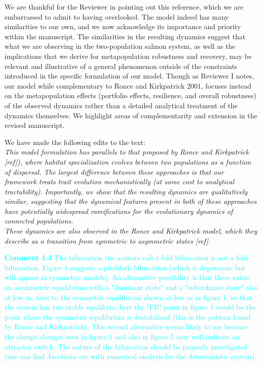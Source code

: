 \documentclass[ucm,12pt]{ucletter}
\begin{document}
\begin{letter}
 We are thankful for the Reviewer in pointing out this reference, which we are embarrassed to admit to having overlooked. The model indeed has many similarities to our own, and we now acknowledge its importance and priority within the manuscript. The similarities in the resulting dynamics suggest that what we are observing in the two-population salmon system, as well as the implications that we derive for metapopulation robustness and recovery, may be  relevant and illustrative of a general phenomenon outside of the constraints introduced in the specific formulation of our model. Though as Reviewer I notes, our model while complementary to Ronce and Kirkpatrick 2001, focuses instead on the metapopulation effects (portfolio effects, resilience, and overall robustness) of the observed dynamics rather than a detailed analytical treatment of the dynamics themselves. We highlight areas of complementarity and extension in the revised manuscript.

\noindent We have made the following edits to the text:\\
 \emph{This model formulation has parallels to that proposed by Ronce and Kirkpatrick [ref]), where habitat specialization evolves between two populations as a function of dispersal.
The largest difference between these approaches is that our framework treats trait evolution mechanistically (at some cost to analytical tractability).
Importantly, we show that the resulting dynamics are qualitatively similar, suggesting that the dynamical features present in both of these approaches have potentially widespread ramifications for the evolutionary dynamics of connected populations.}\\
 \emph{These dynamics are also observed in the Ronce and Kirkpatrick model, which they describe as a transition from symmetric to asymmetric states [ref].}


\noindent \textcolor{cyan}{
{\bf Comment 1.3} The bifurcation the authors call a fold bifurcation is not a fold bifurcation. Figure 1 suggests a pitchfork bifurcation (which is degenerate but will appear in symmetric models). An alternative possibility is that there exists an asymmetric equilibrium with a "dominant state" and a "subordinate state" also at low m, next to the symmetric equilibrium shown at low m in figure 1, so that the system has two stable equilibria; here the "FB" point in figure 1 would be the point where the symmetric equilibrium is destabilized (this is the pattern found by Ronce and Kirkpatrick). This second alternative seems likely to me because the abrupt changes seen in figure 1 and also in figure 5 may well indicate an attractor switch. The nature of the bifurcation should be properly investigated (one can find Jacobians etc with numerical analysis for the deterministic system).
}


\end{letter}
\end{document}
